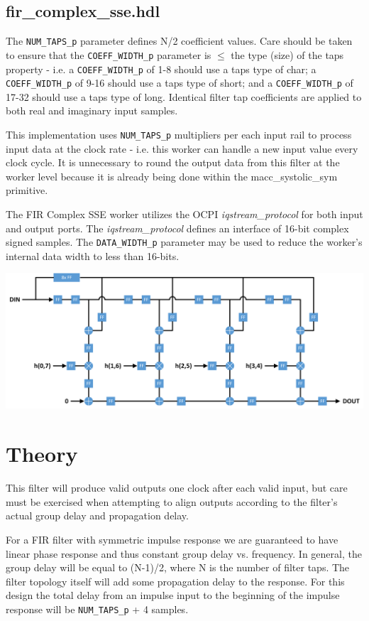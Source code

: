 \documentclass{article}
\def\comp{fir\_complex\_sse}
\begin{document}
\subsection*{\comp.hdl}
\begin{flushleft}
	The \verb+NUM_TAPS_p+ parameter defines N/2 coefficient values. Care should be taken to ensure that the \verb+COEFF_WIDTH_p+ parameter is $\le$ the type (size) of the taps property - i.e. a \verb+COEFF_WIDTH_p+ of 1-8 should use a taps type of char; a \verb+COEFF_WIDTH_p+ of 9-16 should use a taps type of short; and a \verb+COEFF_WIDTH_p+ of 17-32 should use a taps type of long. Identical filter tap coefficients are applied to both real and imaginary input samples.\medskip

	This implementation uses \verb+NUM_TAPS_p+ multipliers per each input rail to process input data at the clock rate - i.e. this worker can handle a new input value every clock cycle. It is unnecessary to round the output data from this filter at the worker level because it is already being done within the macc\_systolic\_sym primitive.\medskip

	The FIR Complex SSE worker utilizes the OCPI \textit{iqstream\_protocol} for both input and output ports. The \textit{iqstream\_protocol} defines an interface of 16-bit complex signed samples. The \verb+DATA_WIDTH_p+ parameter may be used to reduce the worker's internal data width to less than 16-bits.
\end{flushleft}
{\centering\captionsetup{type=figure}\includegraphics[scale=0.65]{fir_systolic_sym_even}\par{}\label{fig:circuit}}

\section*{Theory}
\begin{flushleft}
	This filter will produce valid outputs one clock after each valid input, but care must be exercised when attempting to align outputs according to the filter's actual group delay and propagation delay.\medskip

	For a FIR filter with symmetric impulse response we are guaranteed to have linear phase response and thus constant group delay vs. frequency. In general, the group delay will be equal to (N-1)/2, where N is the number of filter taps.	The filter topology itself will add some propagation delay to the response. For this design the total delay from an impulse input to the beginning of the impulse response will be \verb+NUM_TAPS_p+ + 4 samples.
\end{flushleft}
\end{document}
